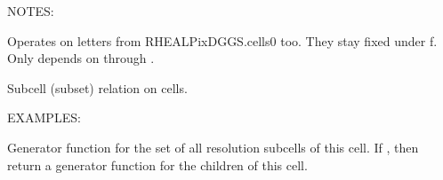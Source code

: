 \documentclass[a4paper,12ptopenany,oneside,english]{sphinxmanual}
\begin{document}
\begin{fulllineitems}
\begin{fulllineitems}
\sphinxAtStartPar
NOTES:

\sphinxAtStartPar
Operates on letters from RHEALPixDGGS.cells0 too.
They stay fixed under f.
Only depends on  through .

\end{fulllineitems}


\begin{fulllineitems}
\label{\detokenize{dggs:rhealpixdggs.dggs.Cell.subcell}}
\pysigstartsignatures
{}
\pysigstopsignatures
\sphinxAtStartPar
Subcell (subset) relation on cells.

\sphinxAtStartPar
EXAMPLES:

\begin{sphinxVerbatim}[commandchars=\\\{\}]
    
   \PYG{p}{[}\PYG{p}{]}
\end{sphinxVerbatim}

\end{fulllineitems}


\begin{fulllineitems}
\label{\detokenize{dggs:rhealpixdggs.dggs.Cell.subcells}}
\pysigstartsignatures
{}
\pysigstopsignatures
\sphinxAtStartPar
Generator function for the set of all resolution  subcells
of this cell.
If , then return a generator function for the children
of this cell.


\end{fulllineitems}
\end{fulllineitems}
\end{document}
